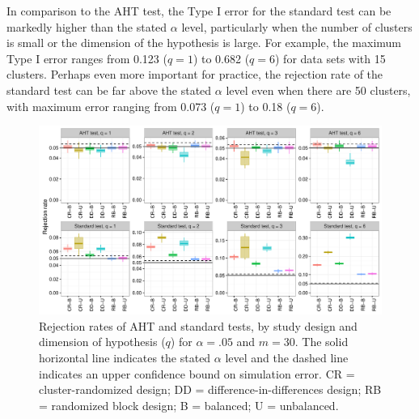 \documentclass[12pt]{article}\usepackage[]{graphicx}\usepackage[]{color}
\newenvironment{knitrout}{}{} %
\begin{document}
In comparison to the AHT test, the Type I error for the standard test can be markedly higher than the stated $\alpha$ level, particularly when the number of clusters is small or the dimension of the hypothesis is large. 
For example, the maximum Type I error ranges from 0.123 ($q = 1$) to 0.682 ($q = 6$) for data sets with 15 clusters.
Perhaps even more important for practice, the rejection rate of the standard test can be far above the stated $\alpha$ level even when there are 50 clusters, with maximum error ranging from 0.073 ($q = 1$) to 0.18 ($q = 6$).

\begin{knitrout}
\color{fgcolor}\begin{figure}

{\centering \includegraphics[width=\linewidth]{CR_fig/balance-1} 

}

\caption[Rejection rates of AHT and standard tests, by study design and dimension of hypothesis (]{Rejection rates of AHT and standard tests, by study design and dimension of hypothesis ($q$) for $\alpha = .05$ and $m = 30$. The solid horizontal line indicates the stated $\alpha$ level and the dashed line indicates an upper confidence bound on simulation error. CR = cluster-randomized design; DD = difference-in-differences design; RB = randomized block design; B = balanced; U = unbalanced.}\label{fig:balance}
\end{figure}


\end{knitrout}
\end{document}
